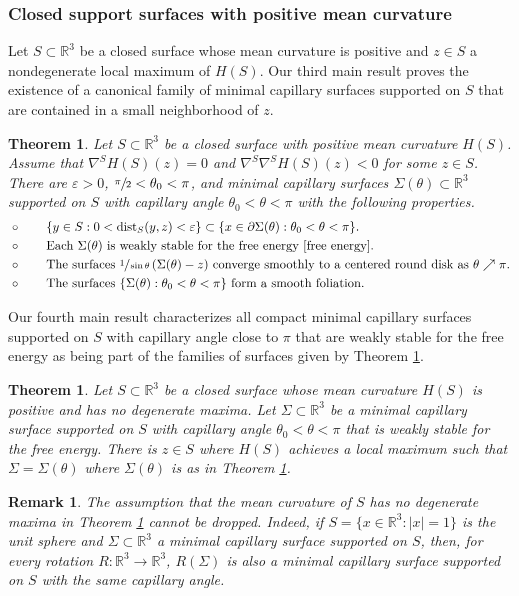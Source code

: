 \documentclass[11pt]{amsart}
\newtheorem{thm}[prop]{Theorem}
\newtheorem{rema}[prop]{Remark}
\begin{document}
\subsubsection*{Closed support surfaces with positive mean curvature}
Let $S\subset \mathbb{R}^3$ be a closed surface whose mean curvature is positive and $z\in S$  a nondegenerate local maximum  of $H(S)$. Our third  main result proves the existence  of a  canonical family of minimal capillary surfaces supported on $S$  that are contained in a small neighborhood of  $z$.
\begin{thm} \label{THM D}
	Let $S\subset \mathbb{R}^3$ be a closed surface with positive mean curvature $H(S)$. Assume that $\nabla^SH(S)(z)=0$ and $\nabla^S\nabla^S H(S)(z)<0$ for some $z\in S$.	There are $\varepsilon>0$, $\sfrac{\pi}2<\theta_0<\pi$, and  minimal capillary surfaces $\Sigma(\theta) \subset \mathbb{R}^3$ supported on $S$ with capillary angle $\theta_0<\theta<\pi$ with the following properties.
	\begin{align*}
		&\circ \qquad \{y\in S:0<\operatorname{dist}_S(y,z)<\varepsilon\}\subset \{x\in\partial \Sigma(\theta):\theta_0<\theta<\pi\}.
		\\		&\circ \qquad \text{Each $\Sigma(\theta)$ is weakly stable for the free energy \eqref{free energy}.}
		\\&\circ  \qquad \text{The surfaces  }\sfrac{1}{\sin\theta}\,(\Sigma(\theta)-z)\text{ converge smoothly to a centered round disk as $\theta\nearrow \pi$.}
			\\ &\circ \qquad \text{The surfaces $\{\Sigma(\theta):\theta_0<\theta<\pi\}$ form  a smooth foliation.}
	\end{align*} 
\end{thm}
Our fourth main result characterizes all compact minimal capillary surfaces supported on $S$ with capillary angle close to $\pi$ that are weakly stable for the free energy  as being part of the families of surfaces given by  Theorem \ref{THM D}.
\begin{thm} \label{THM C}
	Let $S\subset \mathbb{R}^3$ be a closed surface whose mean curvature $H(S)$ is positive and has no degenerate maxima. Let $\Sigma\subset \mathbb{R}^3$ be  a minimal capillary surface supported on $S$ with capillary angle $\theta_0<\theta<\pi$ that is weakly stable for the free energy. There is $z\in S$ where $H(S)$ achieves a local maximum such that $\Sigma=\Sigma(\theta)$ where $\Sigma(\theta)$ is as in Theorem \ref{THM D}. 
\end{thm}
\begin{rema} \label{counter 2}
	The assumption that the mean curvature of $S$ has no degenerate maxima in Theorem \ref{THM C} cannot be dropped. Indeed, if $S=\{x\in \mathbb{R}^3:|x|=1\}$ is the unit sphere and $\Sigma\subset \mathbb{R}^3$ a minimal capillary surface supported on $S$, then, for every rotation $R:\mathbb{R}^3\to \mathbb{R}^3$, $R(\Sigma)$ is also a minimal capillary surface supported on $S$ with the same capillary angle.
\end{rema}
\end{document}
